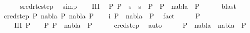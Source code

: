 \begin{isabellebody}
\ \ \ \ \isamarkupfalse%
\ sred{\isacharunderscore}{\kern0pt}rtc{\isacharunderscore}{\kern0pt}step\ \isamarkupfalse%
\ simp\isanewline
\ \ \isamarkupfalse%
\ IH{\isacharparenleft}{\kern0pt}{}{\isacharparenright}{\kern0pt}\ \isamarkupfalse%
\ {\isachardoublequoteopen}{\isasymexists}P{}{\isachardot}{\kern0pt}\ P{}\ {\isasymturnstile}\ s{}\ {\isasymbullet}\ s{}\ {\isasymleadsto}\isactrlsup {\isacharasterisk}{\kern0pt}\ P{}\ {\isasymand}\ P{}\ {\isasymturnstile}\ nabla{}\ {\isasymrightarrow}\isactrlsup {\isacharasterisk}{\kern0pt}\ P{}{\isachardoublequoteclose}\isanewline
\ \ \ \ \isamarkupfalse%
\ blast\isanewline
{}\isamarkupfalse%
\isanewline
\ \ \isamarkupfalse%
\ {\isacharparenleft}{\kern0pt}cred{\isacharunderscore}{\kern0pt}step\ P{}\ nabla{}\ P{\isacharprime}{\kern0pt}\ nabla{}\ P{}{\isacharparenright}{\kern0pt}\isanewline
\ \ \isamarkupfalse%
\ i{\isacharcolon}{\kern0pt}\ {\isachardoublequoteopen}P{}\ {\isasymturnstile}\ nabla{}\ {\isasymrightarrow}\ P{\isacharprime}{\kern0pt}{\isachardoublequoteclose}\ \isamarkupfalse%
\ fact\isanewline
\ \ \isamarkupfalse%
\ \isamarkupfalse%
\ P{}\ \isanewline
\ \ \ \ IH{\isacharcolon}{\kern0pt}\ {\isachardoublequoteopen}P{\isacharprime}{\kern0pt}\ {\isasymturnstile}\ {\isacharbrackleft}{\kern0pt}{\isacharbrackright}{\kern0pt}\ {\isasymleadsto}\isactrlsup {\isacharasterisk}{\kern0pt}\ P{}{\isachardoublequoteclose}\ {\isachardoublequoteopen}P{}\ {\isasymturnstile}\ nabla{}\ {\isasymrightarrow}\isactrlsup {\isacharasterisk}{\kern0pt}\ P{}{\isachardoublequoteclose}\isanewline
\ \ \ \ \isamarkupfalse%
\ cred{\isacharunderscore}{\kern0pt}step{\isacharparenleft}{\kern0pt}{}{\isacharparenright}{\kern0pt}\ \isamarkupfalse%
\ auto\isanewline
\ \ \isamarkupfalse%
\ \isamarkupfalse%
\ {\isachardoublequoteopen}P{}\ {\isasymturnstile}\ {\isacharparenleft}{\kern0pt}nabla{}\ {\isasymunion}\ nabla{}{\isacharparenright}{\kern0pt}\ {\isasymrightarrow}\isactrlsup {\isacharasterisk}{\kern0pt}\ P{}{\isachardoublequoteclose}\isanewline

\end{isabellebody}
